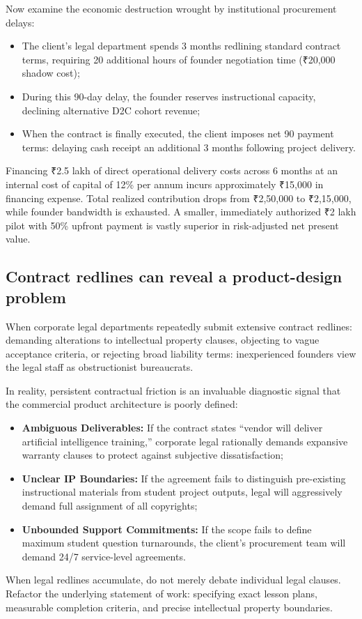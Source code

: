 Now examine the economic destruction wrought by institutional procurement delays:
\begin{itemize}
\item The client's legal department spends 3 months redlining standard contract terms, requiring 20 additional hours of founder negotiation time (₹20,000 shadow cost);
\item During this 90-day delay, the founder reserves instructional capacity, declining alternative D2C cohort revenue;
\item When the contract is finally executed, the client imposes net 90 payment terms: delaying cash receipt an additional 3 months following project delivery.
\end{itemize}
Financing ₹2.5 lakh of direct operational delivery costs across 6 months at an internal cost of capital of 12\% per annum incurs approximately ₹15,000 in financing expense. Total realized contribution drops from ₹2,50,000 to ₹2,15,000, while founder bandwidth is exhausted. A smaller, immediately authorized ₹2 lakh pilot with 50\% upfront payment is vastly superior in risk-adjusted net present value.

\subsection{Contract redlines can reveal a product-design problem}

When corporate legal departments repeatedly submit extensive contract redlines: demanding alterations to intellectual property clauses, objecting to vague acceptance criteria, or rejecting broad liability terms: inexperienced founders view the legal staff as obstructionist bureaucrats.

In reality, persistent contractual friction is an invaluable diagnostic signal that the commercial product architecture is poorly defined:
\begin{itemize}
\item \textbf{Ambiguous Deliverables:} If the contract states ``vendor will deliver artificial intelligence training,'' corporate legal rationally demands expansive warranty clauses to protect against subjective dissatisfaction;
\item \textbf{Unclear IP Boundaries:} If the agreement fails to distinguish pre-existing instructional materials from student project outputs, legal will aggressively demand full assignment of all copyrights;
\item \textbf{Unbounded Support Commitments:} If the scope fails to define maximum student question turnarounds, the client's procurement team will demand 24/7 service-level agreements.
\end{itemize}
When legal redlines accumulate, do not merely debate individual legal clauses. Refactor the underlying statement of work: specifying exact lesson plans, measurable completion criteria, and precise intellectual property boundaries.

